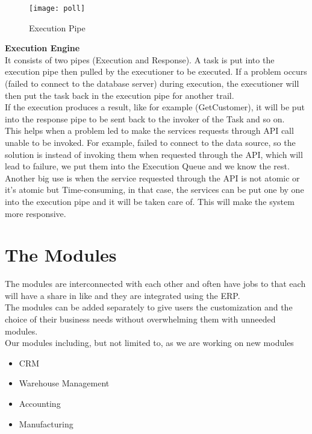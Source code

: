 \begin{adjustwidth}{2cm}{}
\begin{itemize}
\end{itemize}

\begin{figure}
    \texttt{[image: poll]}
    \centering
    \caption{Execution Pipe}
    \label{fig:poll}
\end{figure}


    \textbf{Execution Engine}\\
        It consists of two pipes (Execution and Response). A task is put into the execution pipe then
pulled by the executioner to be executed. If a problem occurs (failed to connect to the
database server) during execution, the executioner will then put the task back in the execution
pipe for another trail.\\
If the execution produces a result, like for example (GetCustomer), it will be put into the
response pipe to be sent back to the invoker of the Task and so on.\\
This helps when a problem led to make the services requests through API call unable to be
invoked. For example, failed to connect to the data source, so the solution is instead of
invoking them when requested through the API, which will lead to failure, we put them into
the Execution Queue and we know the rest.\\
Another big use is when the service requested through the API is not atomic or it’s atomic but
Time-consuming, in that case, the services can be put one by one into the execution pipe and
it will be taken care of. This will make the system more responsive.
        
        
    
    
\end{adjustwidth}

\section{The Modules}

The modules are interconnected with each other and often have jobs to that each will have a share in
like and they are integrated using the ERP.\\
The modules can be added separately to give users the customization and the choice of their business
needs without overwhelming them with unneeded modules.\\
Our modules including, but not limited to, as we are working on new modules
\begin{itemize}
    \item CRM
    \item Warehouse Management
    \item Accounting
    \item Manufacturing
\end{itemize}

